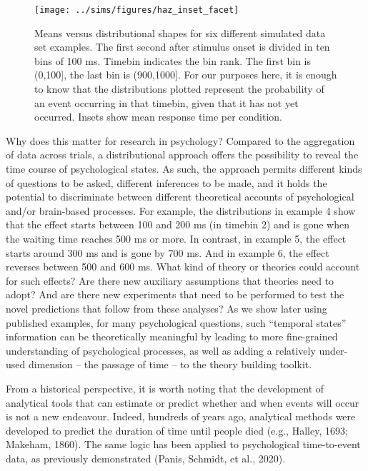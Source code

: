 \documentclass[
  man, donotrepeattitle,floatsintext]{apa6}
\begin{document}
\begin{figure}[H]

{\centering \texttt{[image: ../sims/figures/haz\_inset\_facet]} 

}

\caption{Means versus distributional shapes for six different simulated data set examples. The first second after stimulus onset is divided in ten bins of 100 ms. Timebin indicates the bin rank. The first bin is (0,100{]}, the last bin is (900,1000{]}. For our purposes here, it is enough to know that the distributions plotted represent the probability of an event occurring in that timebin, given that it has not yet occurred. Insets show mean response time per condition.}\label{fig:plot1}
\end{figure}

Why does this matter for research in psychology? Compared to the aggregation of data across trials, a distributional approach offers the possibility to reveal the time course of psychological states. As such, the approach permits different kinds of questions to be asked, different inferences to be made, and it holds the potential to discriminate between different theoretical accounts of psychological and/or brain-based processes.
For example, the distributions in example 4 show that the effect starts between 100 and 200 ms (in timebin 2) and is gone when the waiting time reaches 500 ms or more. In contrast, in example 5, the effect starts around 300 ms and is gone by 700 ms. And in example 6, the effect reverses between 500 and 600 ms. What kind of theory or theories could account for such effects? Are there new auxiliary assumptions that theories need to adopt? And are there new experiments that need to be performed to test the novel predictions that follow from these analyses? As we show later using published examples, for many psychological questions, such ``temporal states'' information can be theoretically meaningful by leading to more fine-grained understanding of psychological processes, as well as adding a relatively under-used dimension -- the passage of time -- to the theory building toolkit.

From a historical perspective, it is worth noting that the development of analytical tools that can estimate or predict whether and when events will occur is not a new endeavour.
Indeed, hundreds of years ago, analytical methods were developed to predict the duration of time until people died (e.g., Halley, 1693; Makeham, 1860).
The same logic has been applied to psychological time-to-event data, as previously demonstrated (Panis, Schmidt, et al., 2020).
\end{document}
